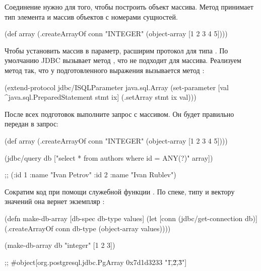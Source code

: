 Соединение нужно для того, чтобы построить объект массива. Метод  принимает тип элемента и массив объектов  с номерами сущностей.

\begin{english}
  \begin{clojure}
(def array
  (.createArrayOf conn "INTEGER" (object-array [1 2 3 4 5])))
  \end{clojure}
\end{english}

Чтобы установить массив в параметр, расширим протокол  для типа . По умолчанию JDBC вызывает метод , что не подходит для массива. Реализуем метод  так, что у подготовленного выражения вызывается метод :

\begin{english}
  \begin{clojure}
(extend-protocol jdbc/ISQLParameter
  java.sql.Array
  (set-parameter [val ^java.sql.PreparedStatement stmt ix]
    (.setArray stmt ix val)))
  \end{clojure}
\end{english}

После всех подготовок выполните запрос с массивом. Он будет правильно передан в запрос:

\begin{english}
  \begin{clojure}
(def array
  (.createArrayOf conn "INTEGER" (object-array [1 2 3 4 5])))

(jdbc/query db ["select * from authors where id = ANY(?)" array])

;; ({:id 1 :name "Ivan Petrov"} {:id 2 :name "Ivan Rublev"})
  \end{clojure}
\end{english}

Сократим код при помощи служебной функции . По спеке, типу и вектору значений она вернет экземпляр :

\begin{english}
  \begin{clojure}
(defn make-db-array [db-spec db-type values]
  (let [conn (jdbc/get-connection db)]
    (.createArrayOf conn db-type (object-array values))))


(make-db-array db "integer" [1 2 3])

;; #object[org.postgresql.jdbc.PgArray 0x7d1d3233 "{\"1\",\"2\",\"3\"}"]
  \end{clojure}
\end{english}

